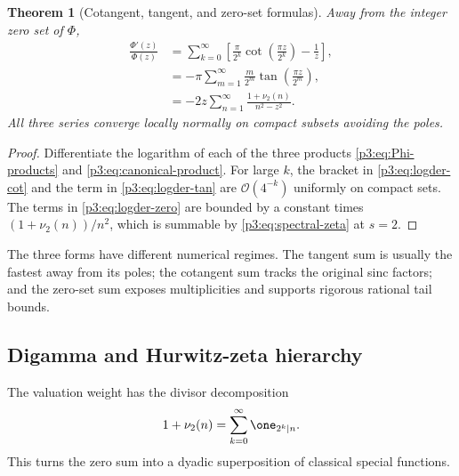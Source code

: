 \documentclass[11pt,oneside]{article}
\newtheorem{theorem}{Theorem}[section]
\theoremstyle{definition}
\newcommand{\bigO}{\mathcal O}
\begin{document}
\begin{theorem}[Cotangent, tangent, and zero-set formulas]\label{p3:thm:three-logder}
Away from the integer zero set of \(\Phi\),
\begin{align}
 \frac{\Phi'(z)}{\Phi(z)}
 &=\sum_{k=0}^{\infty}
 \left[
 \frac{\pi}{2^k}\cot\!\left(\frac{\pi z}{2^k}\right)-\frac1z
 \right],                                                    \label{p3:eq:logder-cot}\\
 &=-\pi\sum_{m=1}^{\infty}\frac{m}{2^m}
 \tan\!\left(\frac{\pi z}{2^m}\right),                    \label{p3:eq:logder-tan}\\
 &=-2z\sum_{n=1}^{\infty}\frac{1+\nu_2(n)}{n^2-z^2}.       \label{p3:eq:logder-zero}
\end{align}
All three series converge locally normally on compact subsets avoiding the poles.
\end{theorem}

\begin{proof}
Differentiate the logarithm of each of the three products
\eqref{p3:eq:Phi-products} and \eqref{p3:eq:canonical-product}.  For large \(k\), the bracket
in \eqref{p3:eq:logder-cot} and the term in \eqref{p3:eq:logder-tan} are \(\bigO(4^{-k})\)
uniformly on compact sets.  The terms in \eqref{p3:eq:logder-zero} are bounded by a constant
times \((1+\nu_2(n))/n^2\), which is summable by \eqref{p3:eq:spectral-zeta} at \(s=2\).
\end{proof}

The three forms have different numerical regimes.  The tangent sum is usually the fastest
away from its poles; the cotangent sum tracks the original sinc factors; and the zero-set
sum exposes multiplicities and supports rigorous rational tail bounds.

\subsection{Digamma and Hurwitz-zeta hierarchy}

The valuation weight has the divisor decomposition
\begin{equation}
 1+\nu_2(n)=\sum_{k=0}^{\infty}\one_{2^k\mid n}.             \label{p3:eq:valuation-indicators}
\end{equation}
This turns the zero sum into a dyadic superposition of classical special functions.
\end{document}
